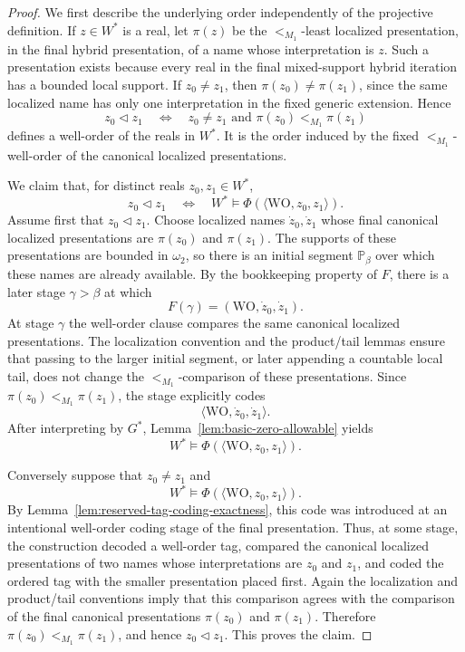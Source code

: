 \documentclass[a4paper,11pt]{article}
\begin{document}
\begin{proof}
We first describe the underlying order independently of the projective definition.  If \(z\in W^\ast\) is a real, let \(\pi(z)\) be the \(<_{M_1}\)-least localized presentation, in the final hybrid presentation, of a name whose interpretation is \(z\).  Such a presentation exists because every real in the final mixed-support hybrid iteration has a bounded local support.  If \(z_0\ne z_1\), then \(\pi(z_0)\ne\pi(z_1)\), since the same localized name has only one interpretation in the fixed generic extension.  Hence
\[
   z_0\triangleleft z_1
   \quad\Longleftrightarrow\quad
   z_0\ne z_1\text{ and }\pi(z_0)<_{M_1}\pi(z_1)
\]
defines a well-order of the reals in \(W^\ast\).  It is the order induced by the fixed $<_{M_1}$-well-order of the canonical localized presentations.

We claim that, for distinct reals \(z_0,z_1\in W^\ast\),
\[
   z_0\triangleleft z_1
   \quad\Longleftrightarrow\quad
   W^\ast\models \Phi(\langle\mathrm{WO},z_0,z_1\rangle).
\]
Assume first that \(z_0\triangleleft z_1\).  Choose localized names \(\dot z_0,\dot z_1\) whose final canonical localized presentations are \(\pi(z_0)\) and \(\pi(z_1)\).  The supports of these presentations are bounded in \(\omega_2\), so there is an initial segment \(\mathbb P_\beta\) over which these names are already available.  By the bookkeeping property of \(F\), there is a later stage \(\gamma>\beta\) at which
\[
   F(\gamma)=(\mathrm{WO},\dot z_0,\dot z_1).
\]
At stage \(\gamma\) the well-order clause compares the same canonical localized presentations.  The localization convention and the product/tail lemmas ensure that passing to the larger initial segment, or later appending a countable local tail, does not change the \(<_{M_1}\)-comparison of these presentations.  Since \(\pi(z_0)<_{M_1}\pi(z_1)\), the stage explicitly codes
\[
   \langle\mathrm{WO},\dot z_0,\dot z_1\rangle.
\]
After interpreting by \(G^\ast\), Lemma~\ref{lem:basic-zero-allowable} yields
\[
   W^\ast\models \Phi(\langle\mathrm{WO},z_0,z_1\rangle).
\]

Conversely suppose that \(z_0\ne z_1\) and
\[
   W^\ast\models \Phi(\langle\mathrm{WO},z_0,z_1\rangle).
\]
By Lemma~\ref{lem:reserved-tag-coding-exactness}, this code was introduced at an intentional well-order coding stage of the final presentation.  Thus, at some stage, the construction decoded a well-order tag, compared the canonical localized presentations of two names whose interpretations are \(z_0\) and \(z_1\), and coded the ordered tag with the smaller presentation placed first.  Again the localization and product/tail conventions imply that this comparison agrees with the comparison of the final canonical presentations \(\pi(z_0)\) and \(\pi(z_1)\).  Therefore \(\pi(z_0)<_{M_1}\pi(z_1)\), and hence \(z_0\triangleleft z_1\).  This proves the claim.


\end{proof}
\end{document}
